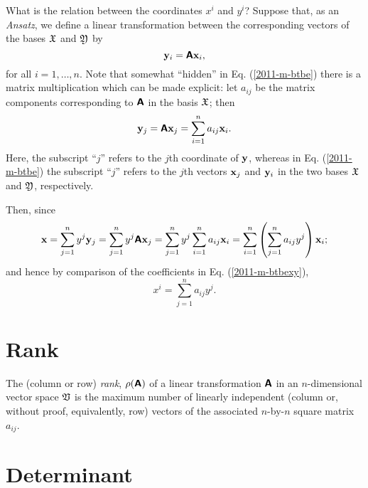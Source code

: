 What is the relation between the coordinates $x^i$ and $y^i$?
Suppose that, as an {\it Ansatz},
we define a linear transformation between the corresponding vectors of the bases
 ${\frak X}$ and
${\frak Y}$ by
\begin{equation}
{\bf y}_i=  \textsf{\textbf{A}}{\bf x}_i
,
\label{2011-m-btbe}
\end{equation}
for all $i=1, \ldots , n$.
Note that somewhat ``hidden'' in Eq. (\ref{2011-m-btbe})
there is a matrix multiplication which can be made explicit:
let $a_{ij}$ be the matrix components corresponding to $\textsf{\textbf{A}}$
in the basis ${\frak X}$;
then
\begin{equation}
{\bf y}_j=  \textsf{\textbf{A}}{\bf x}_j  =   \sum_{i=1}^n a_{ij}{\bf x}_i.
\end{equation}
Here, the subscript ``$j$'' refers to the $j$th coordinate of ${\bf y}$,
whereas
in Eq. (\ref{2011-m-btbe})
the subscript ``$j$'' refers to the $j$th vectors  ${\bf x}_j$ and ${\bf y}_i$ in the two bases  ${\frak X}$ and
${\frak Y}$, respectively.

Then, since
$${\bf x} =
 \sum_{j=1}^n y^j {\bf y}_j=
 \sum_{j=1}^n  y^j \textsf{\textbf{A}}{\bf x}_j=
 \sum_{j=1}^n  y^j  \sum_{i=1}^n a_{ij}{\bf x}_i=
  \sum_{i=1}^n \left(\sum_{j=1}^n  a_{ij}y^j \right)   {\bf x}_i;
$$
and hence by comparison of the coefficients in Eq. (\ref{2011-m-btbexy}),
\begin{equation}
x^i= \sum_{j=1}^n  a_{ij}y^j.
\end{equation}




\section{Rank}


The (column or row) {\em rank}, $\rho (\textsf{\textbf{A}})$
of a linear transformation $\textsf{\textbf{A}}$
in an $n$-dimensional vector space ${\frak V}$
is the maximum number of linearly independent (column or, without proof, equivalently,
row) vectors of the associated $n$-by-$n$ square matrix $a_{ij}$.



\section{Determinant}

